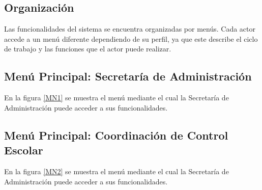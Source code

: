 \subsection{Organización}

Las funcionalidades del sistema se encuentra organizadas por menús. Cada actor accede a un menú diferente dependiendo de su perfil, ya que este describe el ciclo de trabajo y las funciones que el actor puede realizar.


\hypertarget{menu:SecretariaAdministracion}{}	
\subsection{Menú Principal: Secretaría de Administración}
En la figura \ref{MN1} se muestra el menú mediante el cual la Secretaría de Administración puede acceder a sus funcionalidades.

\hypertarget{menu:CoordinacionControlEscolar}{}	
\subsection{Menú Principal: Coordinación de Control Escolar}
En la figura \ref{MN2} se muestra el menú mediante el cual la Secretaría de Administración puede acceder a sus funcionalidades.
